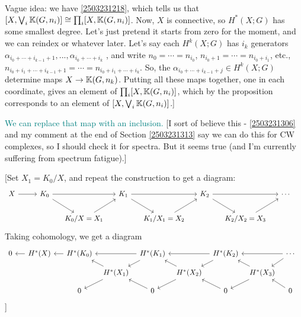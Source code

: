 \documentclass{MetricNotes2023}
\def\bb{\ensuremath\mathbb}
\def\textcolour{\textcolor}
\begin{document}
Vague idea: we have \ref{2503231218}, which tells us that \([X, \bigvee_i \bb{K}(G,n_i)]\cong \prod_i[X, \bb{K}(G,n_i)]\). Now, \(X\) is connective, so \(H^*(X;G)\) has some smallest degree. Let's just pretend it starts from zero for the moment, and we can reindex or whatever later. Let's say each \(H^k(X;G)\) has \(i_k\) generators \(\alpha_{i_0+\cdots+i_{k-1}+1}, ...,\alpha_{i_0+\cdots+i_k}\)  , and write \(n_0=\cdots=n_{i_0}\), \(n_{i_0+1}=\cdots= n_{i_0+i_1}\), etc., \(n_{i_0+i_1+\cdots+i_{k-1}+1}=\cdots = n_{i_0+i_1+\cdots+i_k}\). So, the \(\alpha_{i_0+\cdots+i_{k-1}+j}\in H^k(X;G)\) determine maps \(X\to \bb{K}(G,n_k)\). Putting all these maps together, one in each coordinate, gives an element of \(\prod_i[X, \bb{K}(G,n_i)]\), which by the proposition corresponds to an element of \([X, \bigvee_i \bb{K}(G,n_i)]\).] 

\textcolour{teal}{We can replace that map with an inclusion.} [I sort of believe this - \ref{2503231306} and my comment at the end of Section \ref{2503231313} say we can do this for CW complexes, so I should check it for spectra. But it seems true (and I'm currently suffering from spectrum fatigue).]

[Set \(X_1=K_0/X\), and repeat the construction to get a diagram:
\begin{equation}\label{2503301114}
\begin{tikzcd}[column sep=3ex] 
 X \arrow[rr, ""]  & & K_0 \arrow[rr, ""] \arrow[dr, ""] & & K_1 \arrow[dr, ""] \arrow[rr, ""] & & K_2 \arrow[dr, ""] \arrow[rr, ""] & & \cdots \\ 
  &&& K_0/X=X_1 \arrow[ur, ""] & & K_1/X_1=X_2 \arrow[ur, ""] & & K_2/X_2=X_3 \arrow[ur, ""] &  &
 \end{tikzcd}\nonumber
\end{equation}
Taking cohomology, we get a diagram
\[\begin{tikzcd}[column sep=1.5ex, row sep = 2ex, arrows=<-]
 0 \arrow[rr, ""] && H^*(X) \arrow[rr,""] & & H^*(K_0) \arrow[rr, ""] \arrow[dr, ""] & & H^*(K_1) \arrow[dr, ""] \arrow[rr, ""] & & H^*(K_2) \arrow[dr, ""] \arrow[rr, ""] & & \cdots \\ 
  &&&&& H^*(X_1) \arrow[ur, ""] \arrow[dr] & & H^*(X_2) \arrow[ur, ""] \arrow[dr] & & H^*(X_3) \arrow[ur, ""] \arrow[dr] &  &\\
&&&& 0 \arrow[ur] && 0 \arrow[ur] && 0 \arrow[ur] && 0
 \end{tikzcd}\] 
]
\end{document}
